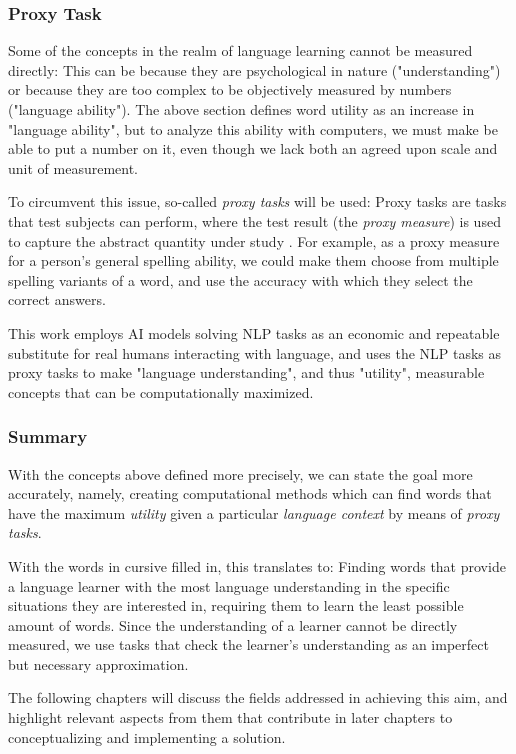 \subsubsection{Proxy Task}
Some of the concepts in the realm of language learning cannot be measured directly:
This can be because they are psychological in nature ("understanding") or because they are too complex to be objectively measured by numbers ("language ability").
The above section defines word utility as an increase in "language ability", but to analyze this ability with computers, we must make be able to put a number on it, even though we lack both an agreed upon scale and unit of measurement.

To circumvent this issue, so-called \textit{proxy tasks} will be used:
Proxy tasks are tasks that test subjects can perform, where the test result (the \textit{proxy measure}) is used to capture the abstract quantity under study .
For example, as a proxy measure for a person's general spelling ability, we could make them choose from multiple spelling variants of a word, and use the accuracy with which they select the correct answers.

This work employs AI models solving NLP tasks as an economic and repeatable substitute for real humans interacting with language, and uses the NLP tasks as proxy tasks to make "language understanding", and thus "utility", measurable concepts that can be computationally maximized.

\subsubsection{Summary}
With the concepts above defined more precisely, we can state the goal more accurately, namely, creating computational methods which can find words that have the maximum \textit{utility} given a particular \textit{language context} by means of \textit{proxy tasks}.

With the words in cursive filled in, this translates to:
Finding words that provide a language learner with the most language understanding in the specific situations they are interested in, requiring them to learn the least possible amount of words.
Since the understanding of a learner cannot be directly measured, we use tasks that check the learner's understanding as an imperfect but necessary approximation.

The following chapters will discuss the fields addressed in achieving this aim, and highlight relevant aspects from them that contribute in later chapters to conceptualizing and implementing a solution.


